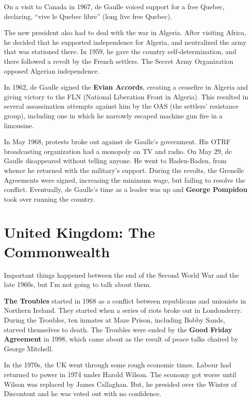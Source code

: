 On a visit to Canada in 1967, de Gaulle voiced support for a free Quebec,
declaring, ``vive le Quebec libre'' (long live free Quebec).

The new president also had to deal with the war in Algeria.
After visiting Africa, he decided that he supported independence for Algeria,
and neutralized the army that was stationed there.
In 1959, he gave the country self-determination, and there followed a revolt by the French settlers.
The Secret Army Organization opposed Algerian independence.

In 1962, de Gaulle signed the \textbf{Evian Accords},
creating a ceasefire in Algeria and giving victory to the FLN (National Liberation Front in Algeria).
This resulted in several assassination attempts against him by the OAS (the settlers' resistance group),
including one in which he narrowly escaped machine gun fire in a limousine.

In May 1968, protests broke out against de Gaulle's government.
His OTRF broadcasting organization had a monopoly on TV and radio.
On May 29, de Gaulle disappeared without telling anyone.
He went to Baden-Baden, from whence he returned with the military's support.
During the revolts, the Grenelle Agreements were signed, increasing the minimum wage,
but failing to resolve the conflict.
Eventually, de Gaulle's time as a leader was up and \textbf{George Pompidou} took over running the country.

\section{United Kingdom: The Commonwealth}

Important things happened between the end of the Second World War and the late 1960s,
but I'm not going to talk about them.

\textbf{The Troubles} started in 1968 as a conflict between republicans and unionists in Northern Ireland.
They started when a series of riots broke out in Londonderry.
During the Troubles, ten inmates at Maze Prison, including Bobby Sands,
starved themselves to death.
The Troubles were ended by the \textbf{Good Friday Agreement} in 1998,
which came about as the result of peace talks chaired by George Mitchell.

In the 1970s, the UK went through some rough economic times.
Labour had returned to power in 1974 under Harold Wilson.
The economy got worse until Wilson was replaced by James Callaghan.
But, he presided over the Winter of Discontent and he was voted out with no confidence.

